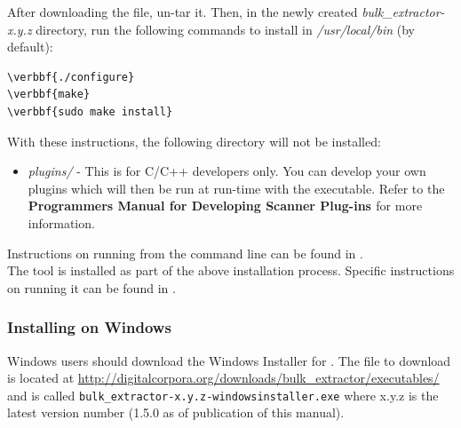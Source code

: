 \documentclass[11pt]{article} %
\begin{document}
After downloading the file, un-tar it. Then, in the newly created \textit{bulk\_extractor-x.y.z} directory, run the following commands to install \bulk in \textit{/usr/local/bin} (by default):

\begin{Verbatim}[commandchars=\\\{\}]
\verbbf{./configure}
\verbbf{make}
\verbbf{sudo make install}
\end{Verbatim}


With these instructions, the following directory will not be installed:
\begin{itemize}
\item{\textit{plugins/} - This is for C/C++ developers only. You can develop your own \bulk plugins which will then be run at run-time with the \bulk executable. Refer to the \textbf{\bulk Programmers Manual for Developing Scanner Plug-ins \cite{programmersmanual}} for more information.}
\end{itemize}
Instructions on running \bulk from the command line can be found in \textbf{}.\\
	
The \viewer tool is installed as part of the above installation process. Specific instructions on running it can be found in \textbf{}.

\subsubsection{Installing on Windows}
\label{InstallOnWindows}
Windows users should download the Windows Installer for \bulk.  The file to download is located at \url{http://digitalcorpora.org/downloads/bulk_extractor/executables/} and is called \texttt{bulk\_extractor-x.y.z-windowsinstaller.exe} where x.y.z is the latest version number (1.5.0 as of publication of this manual).   \\
\end{document}
